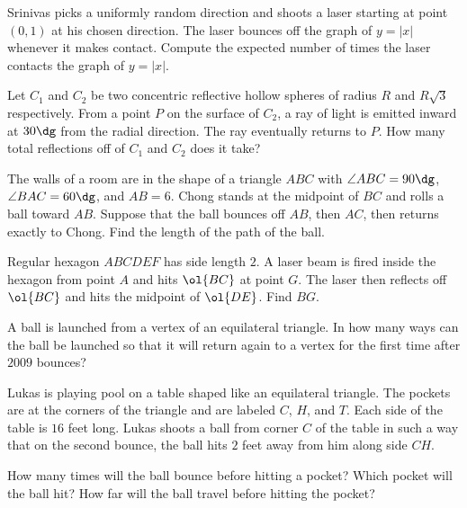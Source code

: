 \documentclass[11pt]{scrartcl}
\begin{document}
\begin{problem} %
    Srinivas picks a uniformly random direction and shoots a laser starting at point $(0,1)$ at his chosen direction. The laser bounces off the graph of $y = \lvert x\rvert$ whenever it makes contact. Compute the expected number of times the laser contacts the graph of $y = \lvert x\rvert$.
\end{problem}

\begin{problem} %
    Let $C_1$ and $C_2$ be two concentric reflective hollow spheres of radius $R$ and $R\sqrt3$ respectively. From a point $P$ on the surface of $C_2$, a ray of light is emitted inward at $30\dg$ from the radial direction. The ray eventually returns to $P$. How many total reflections off of $C_1$ and $C_2$ does it take?
\end{problem}

\begin{problem} %
    The walls of a room are in the shape of a triangle $ABC$ with $\angle ABC = 90\dg$, $\angle BAC = 60\dg$, and $AB = 6$. Chong stands at the midpoint of $BC$ and rolls a ball toward $AB$. Suppose that the ball bounces off $AB$, then $AC$, then returns exactly to Chong. Find the length of the path of the ball.
\end{problem}

\begin{problem} %
    Regular hexagon $ABCDEF$ has side length $2$. A laser beam is fired inside the hexagon from point $A$ and hits $\ol{BC}$ at point $G$. The laser then reflects off $\ol{BC}$ and hits the midpoint of $\ol{DE}$. Find $BG$.
\end{problem}

\begin{problem} %
    A ball is launched from a vertex of an equilateral triangle. In how many ways can the ball be launched so that it will return again to a vertex for the first time after $2009$ bounces?
\end{problem}

\begin{problem} %
    Lukas is playing pool on a table shaped like an equilateral triangle. The pockets are at the corners of the triangle and are labeled $C$, $H$, and $T$. Each side of the table is $16$ feet long. Lukas shoots a ball from corner $C$ of the table in such a way that on the second bounce, the ball hits $2$ feet away from him along side $CH$.
    \begin{enumerate}[(a)]
        \ii How many times will the ball bounce before hitting a pocket?
        \ii Which pocket will the ball hit?
        \ii How far will the ball travel before hitting the pocket?
    \end{enumerate}
\end{problem}
\end{document}
